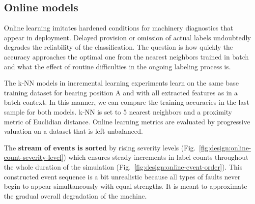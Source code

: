 \subsection{Online models}
Online learning imitates hardened conditions for machinery diagnostics that appear in deployment. Delayed provision or omission of actual labels undoubtedly degrades the reliability of the classification. The question is how quickly the accuracy approaches the optimal one from the nearest neighbors trained in batch and what the effect of routine difficulties in the ongoing labeling process is.

The k-NN models in incremental learning experiments learn on the same base training dataset for bearing position A and with all extracted features as in a batch context. In this manner, we can compare the training accuracies in the last sample for both models. k-NN is set to 5 nearest neighbors and a proximity metric of Euclidian distance. Online learning metrics are evaluated by progressive valuation on a dataset that is left unbalanced.

The \textbf{stream of events is sorted} by rising severity levels (Fig.~\ref{fig:design:online-count-severity-level}) which ensures steady increments in label counts throughout the whole duration of the simulation (Fig.~\ref{fig:design:online-event-order}). This constructed event sequence is a bit unrealistic because all types of faults never begin to appear simultaneously with equal strengths. It is meant to approximate the gradual overall degradation of the machine.

